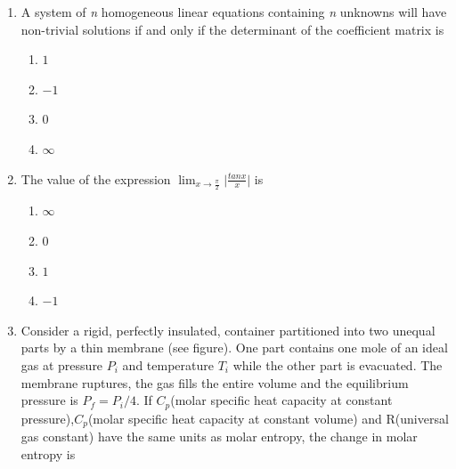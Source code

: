\documentclass[journal]{IEEEtran}
\begin{document}
\begin{enumerate}
    \item A system of \textit{n} homogeneous linear equations containing \textit{n} unknowns will have non-trivial solutions if and only if the determinant of the coefficient matrix is

\begin{multicols}{4}
    \begin{enumerate}
        \item $1$
        \item $-1$
        \item $0$
        \item $\infty$
    \end{enumerate}
\end{multicols}

    \item The value of the expression $\lim_{x\to\frac{\pi}{2}}\big|\frac{tan x}{x}\big|$  is

\begin{multicols}{4}
    \begin{enumerate}
        \item $\infty$
        \item $0$
        \item $1$
        \item $-1$
    \end{enumerate}
\end{multicols}
    \item Consider a rigid, perfectly insulated, container partitioned into two unequal parts by a thin membrane (see figure). One part contains one mole of an ideal gas at pressure \textit{$P_i$} and temperature \textit{$T_i$} while the other part is evacuated. The membrane ruptures, the gas fills the entire volume and the equilibrium pressure is \textit{$P_f = P_i/4$}. If \textit{$C_p$}(molar specific heat capacity at constant pressure),\textit{$C_p$}(molar specific heat capacity at constant volume) and R(universal gas constant) have the same units as molar entropy, the change in molar entropy  is

    


\end{enumerate}
\end{document}
